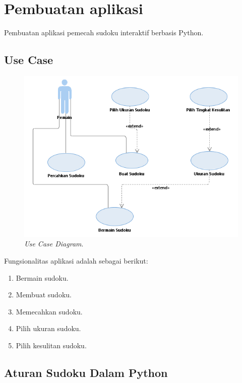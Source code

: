 \section{Pembuatan aplikasi}

Pembuatan aplikasi pemecah sudoku interaktif berbasis Python.

\subsection{Use Case}

\begin{figure}[H]
	\begin{centering}
		\includegraphics[scale=1]{gambar/useCase}
		
		\caption{\textit{Use Case Diagram}.}
	\end{centering}
\end{figure}

Fungsionalitas aplikasi adalah sebagai berikut:
\begin{enumerate}
	\item Bermain sudoku.
	\item Membuat sudoku.
	\item Memecahkan sudoku.
	\item Pilih ukuran sudoku.
	\item Pilih kesulitan sudoku.
\end{enumerate}

\subsection{Aturan Sudoku Dalam Python}

